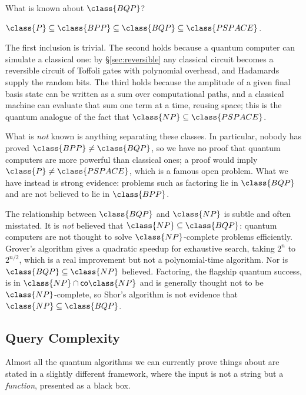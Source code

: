 What is known about $\class{BQP}$?

\begin{proposition}
	$\class{P}\subseteq\class{BPP}\subseteq\class{BQP}\subseteq\class{PSPACE}$.
\end{proposition}

The first inclusion is trivial. The second holds because a quantum computer can simulate a classical one: by \S\ref{sec:reversible} any classical circuit becomes a reversible circuit of Toffoli gates with polynomial overhead, and Hadamards supply the random bits. The third holds because the amplitude of a given final basis state can be written as a sum over computational paths, and a classical machine can evaluate that sum one term at a time, reusing space; this is the quantum analogue of the fact that $\class{NP}\subseteq\class{PSPACE}$.

What is \emph{not} known is anything separating these classes. In particular, nobody has proved $\class{BPP}\neq\class{BQP}$, so we have no proof that quantum computers are more powerful than classical ones; a proof would imply $\class{P}\neq\class{PSPACE}$, which is a famous open problem. What we have instead is strong evidence: problems such as factoring lie in $\class{BQP}$ and are not believed to lie in $\class{BPP}$.

\begin{remark}
	The relationship between $\class{BQP}$ and $\class{NP}$ is subtle and often misstated. It is \emph{not} believed that $\class{NP}\subseteq\class{BQP}$: quantum computers are not thought to solve $\class{NP}$-complete problems efficiently. Grover's algorithm gives a quadratic speedup for exhaustive search, taking $2^n$ to $2^{n/2}$, which is a real improvement but not a polynomial-time algorithm. Nor is $\class{BQP}\subseteq\class{NP}$ believed. Factoring, the flagship quantum success, is in $\class{NP}\cap\mathsf{co}\class{NP}$ and is generally thought not to be $\class{NP}$-complete, so Shor's algorithm is not evidence that $\class{NP}\subseteq\class{BQP}$.
\end{remark}

\subsection{Query Complexity}

Almost all the quantum algorithms we can currently prove things about are stated in a slightly different framework, where the input is not a string but a \emph{function}, presented as a black box.

